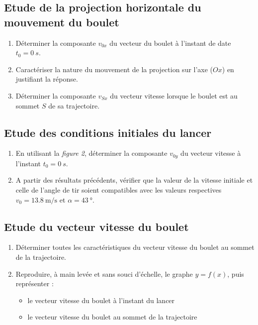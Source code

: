 \documentclass[a4paper,12pt,fleqn]{article}%
\begin{document}
\subsection{Etude de la projection horizontale du mouvement du boulet}
    \begin{enumerate}
        \item Déterminer la composante $v_{0x}$ du vecteur du boulet à l'instant de date $t_0 = \SI{0}{s}$.
        \item Caractériser la nature du mouvement de la projection sur l'axe ($Ox$) en justifiant la réponse.
        \item Déterminer la composante $v_{Sx}$ du vecteur vitesse lorsque le boulet est au sommet $S$ de sa trajectoire.
    \end{enumerate}
\subsection{Etude des conditions initiales du lancer}
    \begin{enumerate}
        \item En utilisant la \emph{figure 2}, déterminer la composante $v_{0y}$ du vecteur vitesse à l'instant $t_0 = \SI{0}{s}$.
        \item A partir des résultats précédents, vérifier que la valeur de la vitesse initiale et celle de l'angle de tir soient compatibles avec les valeurs respectives $v_0 = \SI{13,8}{\meter\per\second}$ et $\alpha = \SI{43}{\degree}$.
    \end{enumerate}
\subsection{Etude du vecteur vitesse du boulet}
    \begin{enumerate}
        \item Déterminer toutes les caractéristiques du vecteur vitesse du boulet au sommet de la trajectoire.
        \item Reproduire, à main levée et sans souci d'échelle, le graphe $y=f(x)$, puis représenter :
            \begin{itemize}
                \item le vecteur vitesse du boulet à l'instant du lancer
                \item le vecteur vitesse du boulet au sommet de la trajectoire
            \end{itemize}
    \end{enumerate}
\end{document}
